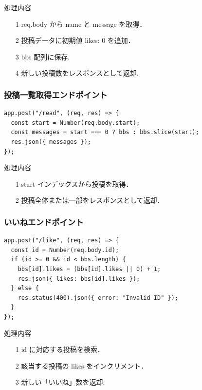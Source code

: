 \documentclass[uplatex,dvipdfmx]{jsarticle}
\begin{document}
\begin{itembox}[c]{処理内容}
    \begin{enumerate}
        \setlength{\leftskip}{0pt}
        \item[1]req.body から name と message を取得．
        \item[2]投稿データに初期値 { likes: 0 } を追加．
        \item[3]bbs 配列に保存.
        \item[4]新しい投稿数をレスポンスとして返却.
    \end{enumerate}
\end{itembox}

\subsubsection{投稿一覧取得エンドポイント}
\begin{lstlisting}[label=c]
app.post("/read", (req, res) => {
  const start = Number(req.body.start);
  const messages = start === 0 ? bbs : bbs.slice(start);
  res.json({ messages });
});

\end{lstlisting}

\begin{itembox}[c]{処理内容}
    \begin{enumerate}
        \setlength{\leftskip}{0pt}
        \item[1]start インデックスから投稿を取得．
        \item[2]投稿全体または一部をレスポンスとして返却．
    \end{enumerate}
\end{itembox}

\subsubsection{いいねエンドポイント}
\begin{lstlisting}[label=d]
app.post("/like", (req, res) => {
  const id = Number(req.body.id);
  if (id >= 0 && id < bbs.length) {
    bbs[id].likes = (bbs[id].likes || 0) + 1;
    res.json({ likes: bbs[id].likes });
  } else {
    res.status(400).json({ error: "Invalid ID" });
  }
});
\end{lstlisting}

\begin{itembox}[c]{処理内容}
    \begin{enumerate}
        \setlength{\leftskip}{0pt}
        \item[1]id に対応する投稿を検索．
        \item[2]該当する投稿の likes をインクリメント．
        \item[3]新しい「いいね」数を返却.
    \end{enumerate}
\end{itembox}
\end{document}

